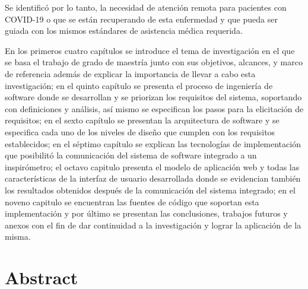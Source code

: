 \documentclass[12pt]{article}
\begin{document}
Se identificó por lo tanto, la necesidad de atención remota para pacientes con COVID-19 o que se están recuperando de esta enfermedad y que pueda ser guiada con los mismos estándares de asistencia médica requerida.

En los primeros cuatro capítulos se introduce el tema de investigación en el que se basa el trabajo de grado de maestría junto con sus objetivos, alcances, y marco de referencia además de explicar la importancia de llevar a cabo esta investigación; en el quinto capítulo se presenta el proceso de ingeniería de software donde se desarrollan y se priorizan los requisitos del sistema, soportando con definiciones y análisis, así mismo se especifican los pasos para la elicitación de requisitos; en el sexto capítulo se presentan la arquitectura de software y se especifica cada uno de los niveles de diseño que cumplen con los requisitos establecidos; en el séptimo capítulo se explican las tecnologías de implementación que posibilitó la comunicación del sistema de software integrado a un inspirómetro; el octavo capitulo presenta el modelo de aplicación web y todas las características de la interfaz de usuario desarrollada donde se evidencian también los resultados obtenidos después de la comunicación del sistema integrado; en el noveno capitulo se encuentran las fuentes de código que soportan esta implementación y por último se presentan las conclusiones, trabajos futuros y anexos con el fin de dar continuidad a la investigación y lograr la aplicación de la misma. 


\newpage

\section*{Abstract}



\newpage

\end{document}
